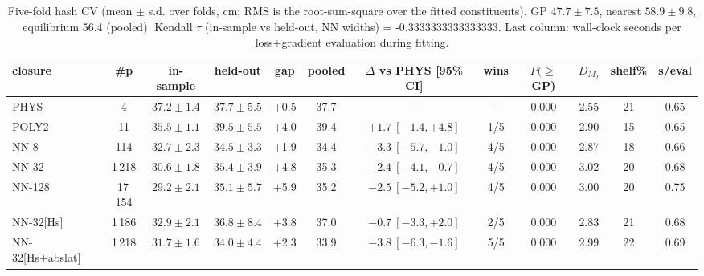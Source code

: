 \begin{table}[t]\centering\footnotesize
\caption{Five-fold hash CV (mean $\pm$ s.d. over folds, cm; RMS is the root-sum-square over the fitted constituents). GP $47.7\pm7.5$, nearest $58.9\pm9.8$, equilibrium 56.4 (pooled). Kendall $\tau$ (in-sample vs held-out, NN widths) = -0.3333333333333333. Last column: wall-clock seconds per loss+gradient evaluation during fitting.}
\label{tab:cv}
\begin{tabular}{lccccccccccc}
\toprule
closure & \#p & in-sample & held-out & gap & pooled & $\Delta$ vs PHYS [95\% CI] & wins & $P(\ge$GP) & $D_{M_2}$ & shelf\% & s/eval \\
\midrule
\textsc{PHYS} & 4 & $37.2\pm1.4$ & $37.7\pm5.5$ & +0.5 & 37.7 & -- & -- & 0.000 & 2.55 & 21 & 0.65 \\
\textsc{POLY2} & 11 & $35.5\pm1.1$ & $39.5\pm5.5$ & +4.0 & 39.4 & $+1.7\ [-1.4,+4.8]$ & 1/5 & 0.000 & 2.90 & 15 & 0.65 \\
\textsc{NN-8} & 114 & $32.7\pm2.3$ & $34.5\pm3.3$ & +1.9 & 34.4 & $-3.3\ [-5.7,-1.0]$ & 4/5 & 0.000 & 2.87 & 18 & 0.66 \\
\textsc{NN-32} & 1\,218 & $30.6\pm1.8$ & $35.4\pm3.9$ & +4.8 & 35.3 & $-2.4\ [-4.1,-0.7]$ & 4/5 & 0.000 & 3.02 & 20 & 0.68 \\
\textsc{NN-128} & 17\,154 & $29.2\pm2.1$ & $35.1\pm5.7$ & +5.9 & 35.2 & $-2.5\ [-5.2,+1.0]$ & 4/5 & 0.000 & 3.00 & 20 & 0.75 \\
\textsc{NN-32}[Hs] & 1\,186 & $32.9\pm2.1$ & $36.8\pm8.4$ & +3.8 & 37.0 & $-0.7\ [-3.3,+2.0]$ & 2/5 & 0.000 & 2.83 & 21 & 0.68 \\
\textsc{NN-32}[Hs+abslat] & 1\,218 & $31.7\pm1.6$ & $34.0\pm4.4$ & +2.3 & 33.9 & $-3.8\ [-6.3,-1.6]$ & 5/5 & 0.000 & 2.99 & 22 & 0.69 \\
\bottomrule
\end{tabular}
\end{table}
